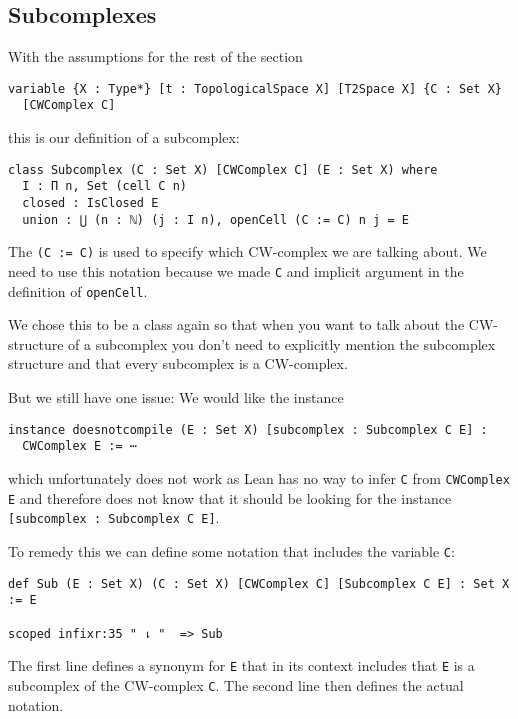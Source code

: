 \subsection{Subcomplexes}

With the assumptions for the rest of the section

\begin{lstlisting}
variable {X : Type*} [t : TopologicalSpace X] [T2Space X] {C : Set X} 
  [CWComplex C]
\end{lstlisting}

this is our definition of a subcomplex:

\begin{lstlisting}
class Subcomplex (C : Set X) [CWComplex C] (E : Set X) where
  I : Π n, Set (cell C n)
  closed : IsClosed E
  union : ⋃ (n : ℕ) (j : I n), openCell (C := C) n j = E
\end{lstlisting}

The \lstinline{(C := C)} is used to specify which CW-complex we are talking about. 
We need to use this notation because we made \lstinline{C} and implicit argument in the definition of \lstinline{openCell}.

We chose this to be a class again so that when you want to talk about the CW-structure of a subcomplex you don't need to explicitly mention the subcomplex structure and that every subcomplex is a CW-complex.

But we still have one issue: 
We would like the instance 

\begin{lstlisting}
instance doesnotcompile (E : Set X) [subcomplex : Subcomplex C E] : 
  CWComplex E := ⋯ 
\end{lstlisting}

which unfortunately does not work as Lean has no way to infer \lstinline{C} from \lstinline{CWComplex E} and therefore does not know that it should be looking for the instance \lstinline{[subcomplex : Subcomplex C E]}. 

To remedy this we can define some notation that includes the variable \lstinline{C}: 

\begin{lstlisting}
def Sub (E : Set X) (C : Set X) [CWComplex C] [Subcomplex C E] : Set X := E

scoped infixr:35 " ⇂ "  => Sub
\end{lstlisting}

The first line defines a synonym for \lstinline{E} that in its context includes that \lstinline{E} is a subcomplex of the CW-complex \lstinline{C}. 
The second line then defines the actual notation. 

